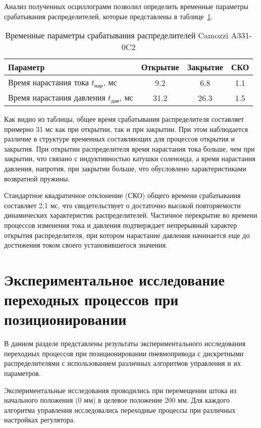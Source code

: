 Анализ полученных осциллограмм позволил определить временные параметры
срабатывания распределителей, которые представлены в таблице~\ref{tab_camozzi}.
\begin{table}[ht]
	\centering
	\caption{Временные параметры срабатывания распределителей Camozzi A331-0C2}
	\label{tab_camozzi}
	\small
	\begin{tabular}{lccc}
		\midrule
		\textbf{Параметр}                              & \textbf{Открытие} & \textbf{Закрытие} & \textbf{СКО} \\
		\midrule
		Время нарастания тока $t_{\text{нар}}$, мс     & \num{9.2 }        & \num{6.8 }        & \num{1.1}    \\
		Время нарастания давления $t_{\text{дав}}$, мс & \num{31.2 }       & \num{26.3}        & \num{1.5}    \\
		\midrule
	\end{tabular}
\end{table}

Как видно из таблицы, общее время срабатывания распределителя составляет примерно 31 мс
как при открытии, так и при закрытии. При этом наблюдается различие в структуре
временных составляющих для процессов открытия и закрытия. При открытии распределителя
время нарастания тока больше, чем при закрытии, что связано с индуктивностью катушки соленоида,
а время нарастания давления, напротив, при закрытии больше, что обусловлено характеристиками возвратной пружины.

Стандартное квадратичное отклонение (СКО) общего времени
срабатывания составляет 2,1 мс, что свидетельствует о достаточно высокой повторяемости
динамических характеристик распределителей. Частичное перекрытие во времени
процессов изменения тока и давления подтверждает непрерывный характер открытия
распределителя, при котором нарастание давления начинается еще до достижения током своего установившегося значения.


\section{Экспериментальное исследование переходных процессов при позиционировании}

В данном разделе представлены результаты экспериментального исследования переходных
процессов при позиционировании пневмопривода с дискретными распределителями с
использованием различных алгоритмов управления и их параметров.

Экспериментальные исследования проводились при перемещении штока из начального положения (0 мм)
в целевое положение 200 мм. Для каждого алгоритма управления исследовались переходные процессы
при различных настройках регулятора.

